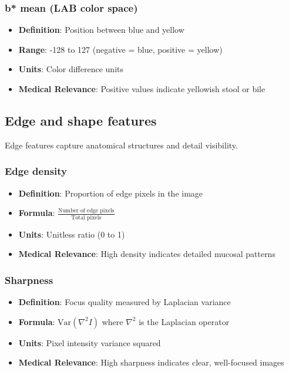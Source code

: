 \documentclass[11pt]{article}
\begin{document}
\subsubsection{b* mean (LAB color space)}
\begin{itemize}
    \item \textbf{Definition}: Position between blue and yellow
    \item \textbf{Range}: -128 to 127 (negative = blue, positive = yellow)
    \item \textbf{Units}: Color difference units
    \item \textbf{Medical Relevance}: Positive values indicate yellowish stool or bile
\end{itemize}

\subsection{Edge and shape features}

Edge features capture anatomical structures and detail visibility.

\subsubsection{Edge density}
\begin{itemize}
    \item \textbf{Definition}: Proportion of edge pixels in the image
    \item \textbf{Formula}: $\displaystyle \frac{\text{Number of edge pixels}}{\text{Total pixels}}$
    \item \textbf{Units}: Unitless ratio (0 to 1)
    \item \textbf{Medical Relevance}: High density indicates detailed mucosal patterns
\end{itemize}

\subsubsection{Sharpness}
\begin{itemize}
    \item \textbf{Definition}: Focus quality measured by Laplacian variance
    \item \textbf{Formula}: $\text{Var}(\nabla^2 I)$ where $\nabla^2$ is the Laplacian operator
    \item \textbf{Units}: Pixel intensity variance squared
    \item \textbf{Medical Relevance}: High sharpness indicates clear, well-focused images
\end{itemize}
\end{document}
